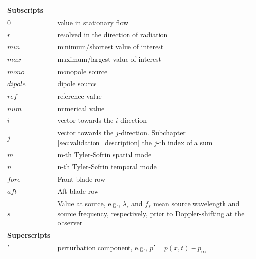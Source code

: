 \begin{longtable}{p{2.5cm} p{13.5cm}}
\textbf{Subscripts} & \\
$0$ & value in stationary flow \\
$r$ & resolved in the direction of radiation \\
$min$ & minimum/shortest value of interest \\
$max$ & maximum/largest value of interest \\
$mono$ & monopole source \\
$dipole$ & dipole source \\
$ref$ & reference value \\
$num$ & numerical value \\
$i$ & vector towards the $i$-direction \\ 
$j$ & vector towards the $j$-direction. Subchapter \ref{sec:validation_description} the $j$-th index of a sum \\
$m$ & m-th Tyler-Sofrin spatial mode \\
$n$ & n-th Tyler-Sofrin temporal mode \\
$fore$ & Front blade row \\
$aft$ & Aft blade row \\
$s$ & Value at source, e.g., $\lambda_s$ and $f_s$ mean source wavelength and source frequency, respectively, prior to Doppler-shifting at the observer \\


\textbf{Superscripts} & \\
$'$ & perturbation component, e.g., $p' = p(x,t) - p_{\infty}$ \\

\end{longtable}